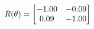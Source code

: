 \documentclass[preview]{standalone}
\begin{document}
\begin{align*}
\special{dvisvgm:raw <g id='unique000'>}R(\theta) = \begin{bmatrix}-1.00 & -0.09\\0.09 & -1.00\end{bmatrix}\special{dvisvgm:raw </g>}
\end{align*}
\end{document}
